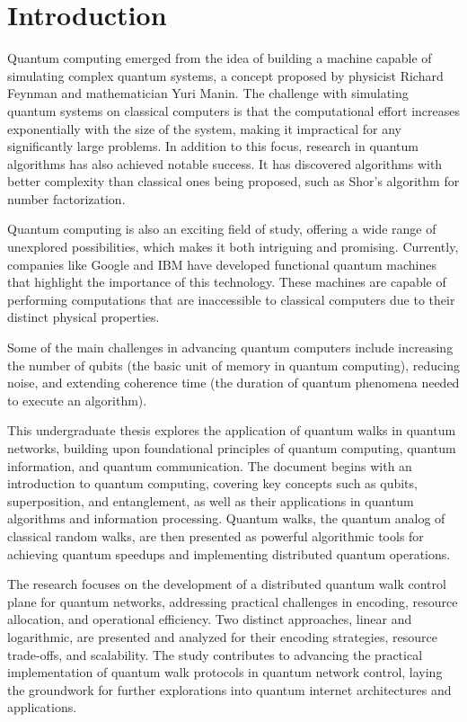 \documentclass{article}
\begin{document}
\newpage
\tableofcontents
\newpage


\section{Introduction}
    Quantum computing emerged from the idea of building a machine capable of simulating complex quantum systems, a concept proposed by physicist Richard Feynman and mathematician Yuri Manin. The challenge with simulating quantum systems on classical computers is that the computational effort increases exponentially with the size of the system, making it impractical for any significantly large problems. In addition to this focus, research in quantum algorithms has also achieved notable success. It has discovered algorithms with better complexity than classical ones being proposed, such as Shor's algorithm for number factorization.

    Quantum computing is also an exciting field of study, offering a wide range of unexplored possibilities, which makes it both intriguing and promising. Currently, companies like Google and IBM have developed functional quantum machines that highlight the importance of this technology. These machines are capable of performing computations that are inaccessible to classical computers due to their distinct physical properties. 
	
	Some of the main challenges in advancing quantum computers include increasing the number of qubits (the basic unit of memory in quantum computing), reducing noise, and extending coherence time (the duration of quantum phenomena needed to execute an algorithm).

	This undergraduate thesis explores the application of quantum walks in quantum networks, building upon foundational principles of quantum computing, quantum information, and quantum communication. The document begins with an introduction to quantum computing, covering key concepts such as qubits, superposition, and entanglement, as well as their applications in quantum algorithms and information processing. Quantum walks, the quantum analog of classical random walks, are then presented as powerful algorithmic tools for achieving quantum speedups and implementing distributed quantum operations. 
	
	The research focuses on the development of a distributed quantum walk control plane for quantum networks, addressing practical challenges in encoding, resource allocation, and operational efficiency. Two distinct approaches, linear and logarithmic, are presented and analyzed for their encoding strategies, resource trade-offs, and scalability. The study contributes to advancing the practical implementation of quantum walk protocols in quantum network control, laying the groundwork for further explorations into quantum internet architectures and applications.
	
\end{document}

